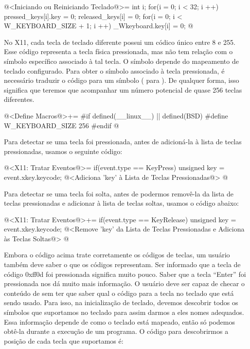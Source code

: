 \iniciocodigo
@<Iniciando ou Reiniciando Teclado@>=
{
  int i;
  for(i = 0; i < 32; i ++){
    pressed_keys[i].key = 0;
    released_keys[i] = 0;
  }
  for(i = 0; i < W_KEYBOARD_SIZE + 1; i ++)
    _Wkeyboard.key[i] = 0;
}
@
\fimcodigo


No X11, cada tecla de teclado diferente possui um códico único entre 8
e 255. Esse código representa a tecla física pressionada, mas não tem
relação com o símbolo específico associado à tal tecla. O símbolo
depende do mapeamento de teclado configurado. Para obter o símbolo
associado à tecla pressionada, é necessário traduzir o código para um
símbolo ( para ). De qualquer
forma, isso significa que teremos que acompanhar um número potencial
de quase 256 teclas diferentes.

\iniciocodigo
@<Define Macros@>+=
#if defined(__linux__) || defined(BSD)
#define W_KEYBOARD_SIZE 256
#endif
@
\fimcodigo

Para detectar se uma tecla foi pressionada, antes de adicioná-la à
lista de teclas pressionadas, usamos o seguinte código:

\iniciocodigo
@<X11: Tratar Eventos@>=
if(event.type == KeyPress){
  unsigned key = event.xkey.keycode;
  @<Adiciona 'key' à Lista de Teclas Pressionadas@>
}
@
\fimcodigo

Para detectar se uma tecla foi solta, antes de podermos removê-la da
lista de teclas pressionadas e adicionar à lista de teclas soltas,
usamos o código abaixo:

\iniciocodigo
@<X11: Tratar Eventos@>+=
if(event.type == KeyRelease){
  unsigned key = event.xkey.keycode;
  @<Remove 'key' da Lista de Teclas Pressionadas e Adiciona às Teclas Soltas@>
}
@
\fimcodigo

Embora o código acima trate corretamente os códigos de teclas, um
usuário também deve saber o que os códigos representam. Ser informado
que a tecla de código 0xff0d foi pressionada significa muito
pouco. Saber que a tecla ``Enter'' foi pressionada nos dá muito mais
informação. O usuário deve ser capaz de checar o conteúdo
de  sem ter que saber qual o código
para a tecla no teclado que está sendo usado. Para isso, na
inicialização de teclado, devemos descobrir todos os símbolos que
suportamos no teclado para assim darmos a eles nomes adequados. Essa
informação depende de como o teclado está mapeado, então só podemos
obtê-la durante a execução de um programa. O código para descobrirmos
a posição de cada tecla que suportamos é:



